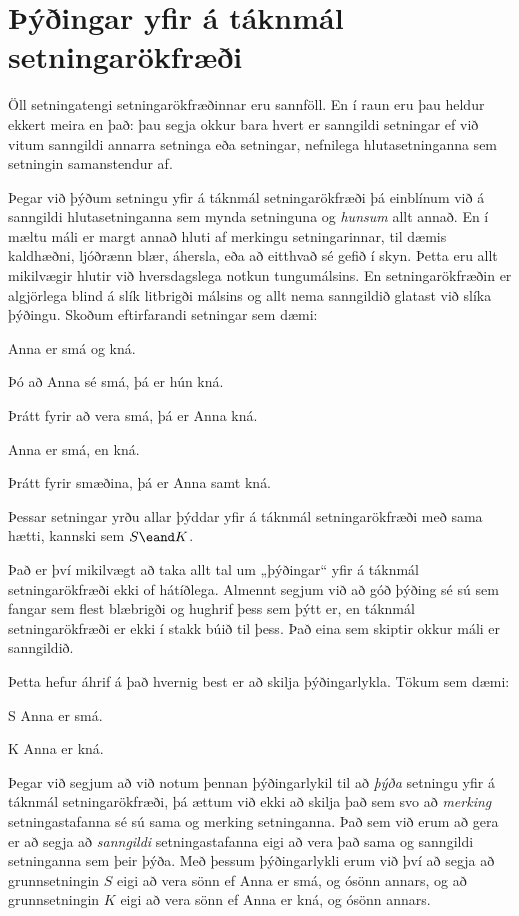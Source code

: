 \section{Þýðingar yfir á táknmál setningarökfræði}

Öll setningatengi setningarökfræðinnar eru sannföll. En í raun eru þau heldur ekkert meira en það: þau segja okkur bara hvert er sanngildi setningar ef við vitum sanngildi annarra setninga eða setningar, nefnilega hlutasetninganna sem setningin samanstendur af.

Þegar við þýðum setningu yfir á táknmál setningarökfræði þá einblínum við á sanngildi hlutasetninganna sem mynda setninguna og \emph{hunsum} allt annað. En í mæltu máli er margt annað hluti af merkingu setningarinnar, til dæmis kaldhæðni, ljóðrænn blær, áhersla, eða að eitthvað sé gefið í skyn. Þetta eru allt mikilvægir hlutir við hversdagslega notkun tungumálsins. En setningarökfræðin er algjörlega blind á slík litbrigði málsins og allt nema sanngildið glatast við slíka þýðingu. Skoðum eftirfarandi setningar sem dæmi:%
	\begin{earg}
		\item Anna er smá og kná.
		\item Þó að Anna sé smá, þá er hún kná.
		\item Þrátt fyrir að vera smá, þá er Anna kná.
		\item Anna er smá, en kná.
		\item Þrátt fyrir smæðina, þá er Anna samt kná.
	\end{earg}
Þessar setningar yrðu allar þýddar yfir á táknmál setningarökfræði með sama hætti, kannski sem $S \eand K$.

Það er því mikilvægt að taka allt tal um „þýðingar“ yfir á táknmál setningarökfræði ekki of hátíðlega. Almennt segjum við að góð þýðing sé sú sem fangar sem flest blæbrigði og hughrif þess sem þýtt er, en táknmál setningarökfræði er ekki í stakk búið til þess. Það eina sem skiptir okkur máli er sanngildið.

Þetta hefur áhrif á það hvernig best er að skilja þýðingarlykla. Tökum sem dæmi:
	\begin{ekey}
		\item[S] Anna er smá.
		\item[K] Anna er kná.
	\end{ekey}
Þegar við segjum að við notum þennan þýðingarlykil til að \emph{þýða} setningu yfir á táknmál setningarökfræði, þá ættum við ekki að skilja það sem svo að \emph{merking} setningastafanna sé sú sama og merking setninganna. Það sem við erum að gera er að segja að \emph{sanngildi} setningastafanna eigi að vera það sama og sanngildi setninganna sem þeir þýða. Með þessum þýðingarlykli erum við því að segja að grunnsetningin $S$ eigi að vera sönn ef Anna er smá, og ósönn annars, og að grunnsetningin $K$ eigi að vera sönn ef Anna er kná, og ósönn annars.

